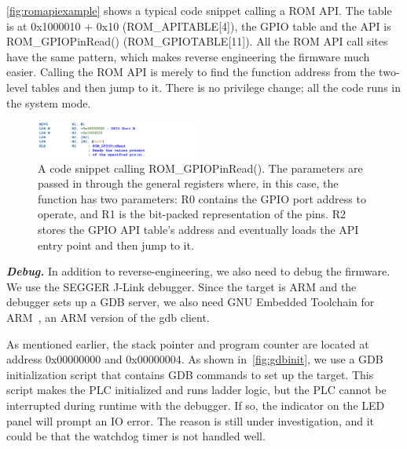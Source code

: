 

\autoref{fig:romapiexample} shows a typical code snippet calling a ROM API. The table is at 0x1000010 + 0x10 (ROM\_APITABLE[4]), the GPIO table and the API is ROM\_GPIOPinRead() (ROM\_GPIOTABLE[11]). All the ROM API call sites have the same pattern, which makes reverse engineering the firmware much easier.  Calling the ROM API is merely to find the function address from the two-level tables and then jump to it. There is no privilege change; all the code runs in the system mode.


\begin{figure}[th]
	\includegraphics[width=0.47\textwidth]{figures/romapiexample2}
	\centering
	\caption{A code snippet calling ROM\_GPIOPinRead(). The parameters are passed in through the general registers where, in this case, the function has two parameters: R0 contains the GPIO port address to operate, and R1 is the bit-packed representation of the pins.  R2 stores the GPIO API table's address and eventually loads the API entry point and then jump to it.}
	\label{fig:romapiexample}
\end{figure}




\textbf{\textit{Debug.}} In addition to reverse-engineering,  we also need to debug the firmware. We use the SEGGER J-Link debugger. Since the target is ARM and the debugger sets up a GDB server, we also need GNU Embedded Toolchain for ARM~\cite{gnutoolchainarm}, an ARM version of the gdb client.


As mentioned earlier, the stack pointer and program counter are located at address 0x00000000 and 0x00000004. As shown in~\autoref{fig:gdbinit}, we use a GDB initialization script that contains GDB commands to set up the target. This script makes the PLC initialized and runs ladder logic, but the PLC cannot be interrupted during runtime with the debugger. If so, the indicator on the LED panel will prompt an IO error. The reason is still under investigation, and it could be that the watchdog timer is not handled well.

